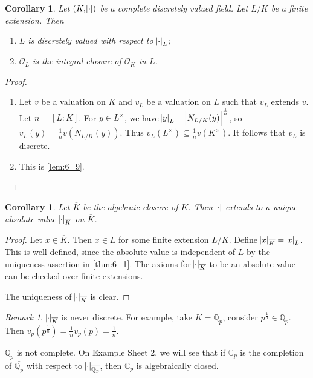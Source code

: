 \documentclass[11pt]{article}
\theoremstyle{definition}
\theoremstyle{plain}
\newtheorem{corollary}[definition]{Corollary}
\theoremstyle{remark}
\newtheorem*{remark}{Remark}
\newcommand{\QQ}{\mathbb{Q}}
\newcommand{\CC}{\mathbb{C}}
\newcommand{\cO}{\mathcal{O}}
\begin{document}
\begin{corollary}\label{cor:6_10}
    Let $(K, \abs{\cdot})$ be a complete discretely valued field. Let $L / K$ be a finite extension. Then
    \begin{enumerate}
        \item $L$ is discretely valued with respect to $\abs{\cdot}_L$;
        \item $\cO_L$ is the integral closure of $\cO_K$ in $L$.
    \end{enumerate}
\end{corollary}
\begin{proof}\phantom{}
    \begin{enumerate}
        \item Let $v$ be a valuation on $K$ and $v_L$ be a valuation on $L$ such that $v_L$ extends $v$. Let $n = [L : K]$. For $y \in L^\times$, we have $\abs{y}_L = \abs{N_{L/K}(y)}^\frac{1}{n}$, so $v_L(y) = \frac{1}{n} v(N_{L/K}(y))$. Thus $v_L(L^\times) \subseteq \frac{1}{n} v(K^\times)$. It follows that $v_L$ is discrete.

        \item This is \autoref{lem:6_9}.\qedhere
    \end{enumerate}
\end{proof}

\begin{corollary}\label{cor:6_11}
    Let $\overline{K}$ be the algebraic closure of $K$. Then $\abs{\cdot}$ extends to a unique absolute value $\abs{\cdot}_{\overline{K}}$ on $\overline{K}$.
\end{corollary}
\begin{proof}
    Let $x \in \overline{K}$. Then $x \in L$ for some finite extension $L/K$. Define $\abs{x}_{\overline{K}} = \abs{x}_L$. This is well-defined, since the absolute value is independent of $L$ by the uniqueness assertion in \autoref{thm:6_1}. The axioms for $\abs{\cdot}_{\overline{K}}$ to be an absolute value can be checked over finite extensions.

    The uniqueness of $\abs{\cdot}_{\overline{K}}$ is clear.
\end{proof}

\begin{remark}
    $\abs{\cdot}_{\overline{K}}$ is never discrete. For example, take $K = \QQ_p$, consider $p^\frac{1}{n} \in \overline{\QQ_p}$. Then $v_p(p^\frac{1}{n}) = \frac{1}{n} v_p(p) = \frac{1}{n}$.

    $\overline{\QQ_p}$ is not complete. On Example Sheet 2, we will see that if $\CC_p$ is the completion of $\overline{\QQ_p}$ with respect to $\abs{\cdot}_{\overline{\QQ_p}}$, then $\CC_p$ is algebraically closed.
\end{remark}
\end{document}
